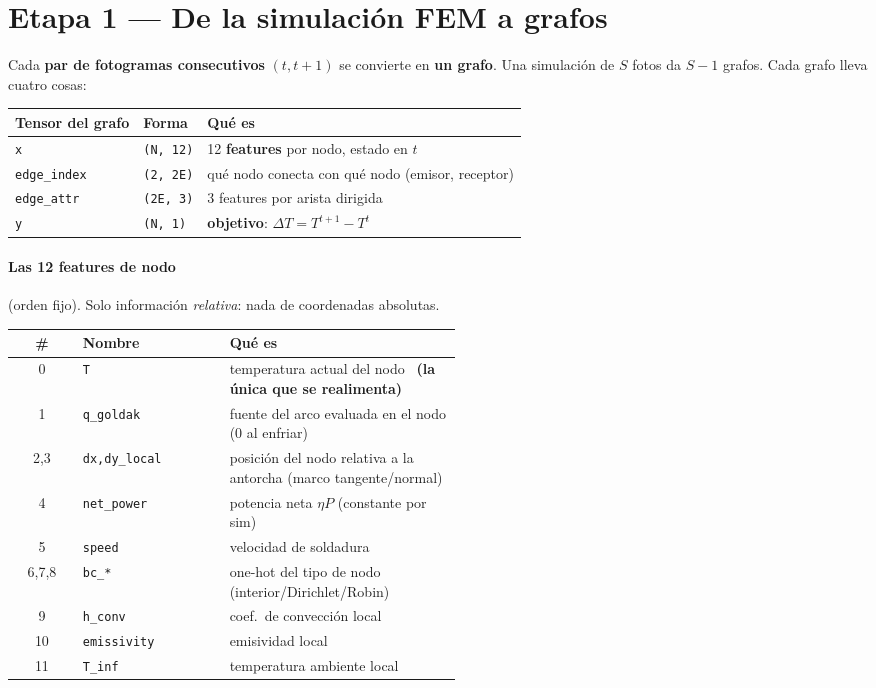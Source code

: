 \documentclass[11pt]{article}
\newcommand{\shp}[1]{{\color{shapecol}\texttt{(#1)}}}   %
\theoremstyle{definition}
\begin{document}
\section{Etapa 1 — De la simulación FEM a grafos}
\label{sec:grafos}

Cada \textbf{par de fotogramas consecutivos} $(t,t{+}1)$ se convierte en
\textbf{un grafo}. Una simulación de $S$ fotos da $S{-}1$ grafos. Cada grafo lleva
cuatro cosas:

\begin{center}\small
\begin{tabular}{@{}lll@{}}
\toprule
Tensor del grafo & Forma & Qué es \\
\midrule
\texttt{x}          & \shp{N, 12} & 12 \textbf{features} por nodo, estado en $t$ \\
\texttt{edge\_index}& \shp{2, 2E} & qué nodo conecta con qué nodo (emisor, receptor) \\
\texttt{edge\_attr} & \shp{2E, 3} & 3 features por arista dirigida \\
\texttt{y}          & \shp{N, 1}  & \textbf{objetivo}: $\Delta T = T^{t+1}-T^{t}$ \\
\bottomrule
\end{tabular}
\end{center}

\paragraph{Las 12 features de nodo} (orden fijo). Solo información \emph{relativa}:
nada de coordenadas absolutas.
\begin{center}\small
\begin{tabular}{@{}clp{0.52\linewidth}@{}}
\toprule
\# & Nombre & Qué es \\
\midrule
0  & \texttt{T}            & temperatura actual del nodo \ \textbf{(la única que se realimenta)} \\
1  & \texttt{q\_goldak}    & fuente del arco evaluada en el nodo (0 al enfriar) \\
2,3& \texttt{dx,dy\_local} & posición del nodo relativa a la antorcha (marco tangente/normal) \\
4  & \texttt{net\_power}   & potencia neta $\eta P$ (constante por sim) \\
5  & \texttt{speed}        & velocidad de soldadura \\
6,7,8 & \texttt{bc\_*}     & one-hot del tipo de nodo (interior/Dirichlet/Robin) \\
9  & \texttt{h\_conv}      & coef.\ de convección local \\
10 & \texttt{emissivity}   & emisividad local \\
11 & \texttt{T\_inf}       & temperatura ambiente local \\
\bottomrule
\end{tabular}
\end{center}
\end{document}

